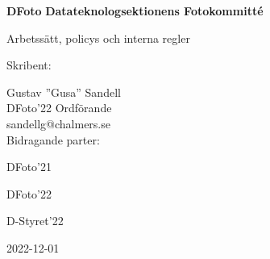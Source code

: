 \begin{titlepage}
   \begin{center}
       \vspace*{1cm}
       \Huge
       \textbf{DFoto}
       \textbf{Datateknologsektionens Fotokommitté}
       \vspace{1.5cm}
       
       \Huge
       \centerline{Arbetssätt, policys och interna regler}
       \vspace{1.5cm}
       
       \large
       Skribent:
       
       \vspace{2mm}
       Gustav ''Gusa'' Sandell\\
       DFoto'22 Ordförande\\
       sandellg@chalmers.se\\

       \vspace{1cm}
       Bidragande parter:
       
       \vspace{2mm}
       DFoto'21
       
       DFoto'22
       
       D-Styret'22
       
       \vspace{1cm}
       \huge
        2022-12-01
   \end{center}
\end{titlepage}